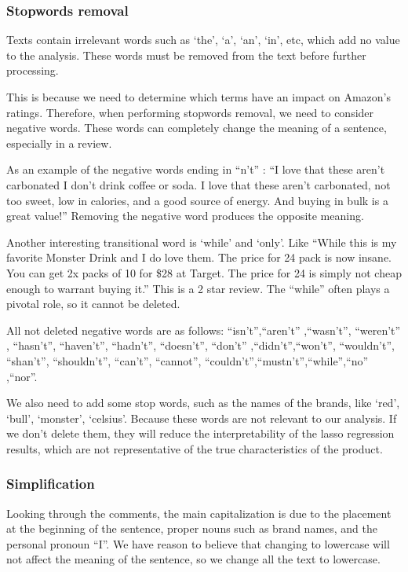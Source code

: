 \documentclass[
]{article}
\begin{document}
\hypertarget{stopwords-removal}{%
\subsubsection{Stopwords removal}\label{stopwords-removal}}

Texts contain irrelevant words such as `the', `a', `an', `in', etc,
which add no value to the analysis. These words must be removed from the
text before further processing.

This is because we need to determine which terms have an impact on
Amazon's ratings. Therefore, when performing stopwords removal, we need
to consider negative words. These words can completely change the
meaning of a sentence, especially in a review.

As an example of the negative words ending in ``n't'' : ``I love that
these aren't carbonated I don't drink coffee or soda. I love that these
aren't carbonated, not too sweet, low in calories, and a good source of
energy. And buying in bulk is a great value!'' Removing the negative
word produces the opposite meaning.

Another interesting transitional word is `while' and `only'. Like
``While this is my favorite Monster Drink and I do love them. The price
for 24 pack is now insane. You can get 2x packs of 10 for \$28 at
Target. The price for 24 is simply not cheap enough to warrant buying
it.'' This is a 2 star review. The ``while'' often plays a pivotal role,
so it cannot be deleted.

All not deleted negative words are as follows: ``isn't'',``aren't''
,``wasn't'', ``weren't'' , ``hasn't'', ``haven't'', ``hadn't'',
``doesn't'', ``don't'' ,``didn't'',``won't'', ``wouldn't'', ``shan't'',
``shouldn't'', ``can't'', ``cannot'',
``couldn't'',``mustn't'',``while'',``no'' ,``nor''.

We also need to add some stop words, such as the names of the brands,
like `red', `bull', `monster', `celsius'. Because these words are not
relevant to our analysis. If we don't delete them, they will reduce the
interpretability of the lasso regression results, which are not
representative of the true characteristics of the product.

\hypertarget{simplification}{%
\subsubsection{Simplification}\label{simplification}}

Looking through the comments, the main capitalization is due to the
placement at the beginning of the sentence, proper nouns such as brand
names, and the personal pronoun ``I''. We have reason to believe that
changing to lowercase will not affect the meaning of the sentence, so we
change all the text to lowercase.
\end{document}
